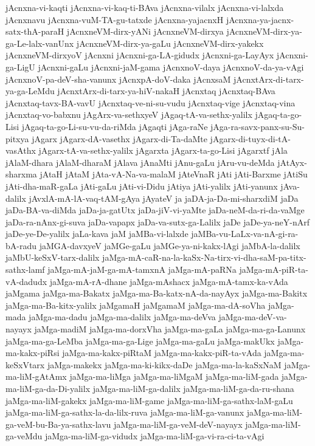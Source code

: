 {jAcnxna-vi-kaqti
jAcnxna-vi-kaq-ti-BAva
jAcnxna-vilalx
jAcnxna-vi-lalxda
jAcnxnavu
jAcnxna-vuM-TA-gu-tatxde
jAcnxna-yajacnxH
jAcnxna-ya-jacnx-satx-thA-paraH
jAcnxneVM-dirx-yANi
jAcnxneVM-dirxya
jAcnxneVM-dirx-ya-ga-Le-lalx-vanUnx
jAcnxneVM-dirx-ya-gaLu
jAcnxneVM-dirx-yakekx
jAcnxneVM-dirxyoV
jAcnxni
jAcnxni-ga-LA-gidudx
jAcnxni-ga-LayAyx
jAcnxni-ga-LigU
jAcnxni-gaLu
jAcnxni-jaM-gama
jAcnxnoV-daya
jAcnxnoV-da-ya-vAgi
jAcnxnoV-pa-deV-sha-vanunx
jAcnxpA-doV-daka
jAcnxsaM
jAcnxtArx-di-tarx-ya-ga-LeMdu
jAcnxtArx-di-tarx-ya-hiV-nakaH
jAcnxtaq
jAcnxtaq-BAva
jAcnxtaq-tavx-BA-vavU
jAcnxtaq-ve-ni-su-vudu
jAcnxtaq-vige
jAcnxtaq-vina
jAcnxtaq-vo-babxnu
jAgArx-va-sethxyeV
jAgaq-tA-va-sethx-yalilx
jAgaq-ta-go-Lisi
jAgaq-ta-go-Li-su-vu-da-riMda
jAgaqti
jAga-raNe
jAga-ra-savx-panx-su-Su-pitxya
jAgarx
jAgarx-dA-vasethx
jAgarx-di-Ta-daMte
jAgarx-di-tuyx-di-tA-vasAthx
jAgarx-tA-va-sethx-yalilx
jAgarxta
jAgarx-ta-go-Lisi
jAgarxtf
jAla
jAlaM-dhara
jAlaM-dharaM
jAlava
jAnaMti
jAnu-gaLu
jAru-vu-deMda
jAtAyx-sharxma
jAtaH
jAtaM
jAta-vA-Na-va-malaM
jAteVnaR
jAti
jAti-Barxme
jAtiSu
jAti-dha-maR-gaLa
jAti-gaLu
jAti-vi-Didu
jAtiya
jAti-yalilx
jAti-yanunx
jAva-dalilx
jAvxlA-mA-lA-vaq-tAM-gAya
jAyateV
ja
jaDA-ja-Da-mi-sharxdiM
jaDa
jaDa-BA-va-diMda
jaDa-ja-gatUtx
jaDa-jiV-vi-yaMte
jaDa-neM-da-ri-da-vaMge
jaDa-ra-nAnx-gi-suva
jaDa-vapapx
jaDa-va-sutx-ga-Lalilx
jaDe
jaDe-ya-neY-nArf
jaDe-ye-De-yalilx
jaLa-kava
jaM
jaMBa-vi-lalxde
jaMBa-vu-LaLx-va-nA-gi-ra-bA-radu
jaMGA-davxyeV
jaMGe-gaLu
jaMGe-ya-ni-kakx-lAgi
jaMbA-la-dalilx
jaMbU-keSxV-tarx-dalilx
jaMga-mA-caR-na-la-kaSx-Na-tirx-vi-dha-saM-pa-titx-sathx-lamf
jaMga-mA-jaM-ga-mA-tamxnA
jaMga-mA-paRNa
jaMga-mA-piR-ta-vA-dadudx
jaMga-mA-rA-dhane
jaMga-mAshacx
jaMga-mA-tamx-ka-vAda
jaMgama
jaMga-ma-Bakatx
jaMga-ma-Ba-katx-nA-da-nayAyx
jaMga-ma-Bakitx
jaMga-ma-Ba-kitx-yalilx
jaMgamaH
jaMgamaM
jaMga-ma-dA-soVha
jaMga-mada
jaMga-ma-dadu
jaMga-ma-dalilx
jaMga-ma-deVva
jaMga-ma-deV-va-nayayx
jaMga-madiM
jaMga-ma-dorxVha
jaMga-ma-gaLa
jaMga-ma-ga-Lanunx
jaMga-ma-ga-LeMba
jaMga-ma-ga-Lige
jaMga-ma-gaLu
jaMga-makUkx
jaMga-ma-kakx-piRsi
jaMga-ma-kakx-piRtaM
jaMga-ma-kakx-piR-ta-vAda
jaMga-ma-keSxVtarx
jaMga-makekx
jaMga-ma-ki-kikx-daDe
jaMga-ma-la-kaSxNaM
jaMga-ma-liM-gAtAmx
jaMga-ma-liMga
jaMga-ma-liMgaM
jaMga-ma-liM-gada
jaMga-ma-liM-ga-da-Di-yalilx
jaMga-ma-liM-ga-dalilx
jaMga-ma-liM-ga-da-ru-shana
jaMga-ma-liM-gakekx
jaMga-ma-liM-game
jaMga-ma-liM-ga-sathx-laM-gaLu
jaMga-ma-liM-ga-sathx-la-da-lilx-ruva
jaMga-ma-liM-ga-vanunx
jaMga-ma-liM-ga-veM-bu-Ba-ya-sathx-lavu
jaMga-ma-liM-ga-veM-deV-nayayx
jaMga-ma-liM-ga-veMdu
jaMga-ma-liM-ga-vidudx
jaMga-ma-liM-ga-vi-ra-ci-ta-vAgi
}
